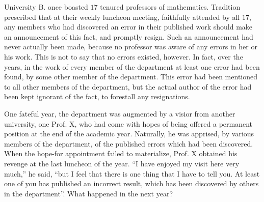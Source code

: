 \begin{pr}[*] \label{2.27} %
  University B. once boasted $17$ tenured professors of
  mathematics. Tradition prescribed that at their weekly
  luncheon meeting, faithfully attended by all $17$, any members
  who had discovered an error in their published work should
  make an announcement of this fact, and promptly resign.
  Such an announcement had never actually been made, because
  no professor was aware of any errors in her or his work.
  This is not to say that no errors existed, however. In fact,
  over the years, in the work of every member of the department
  at least one error had been found, by some other member of the
  department. This error had been mentioned to all other members
  of the department, but the actual author of the error
  had been kept ignorant of the fact, to forestall any
  resignations.
  \par
  One fateful year, the department was augmented by a visior
  from another university, one Prof. X, who had come with
  hopes of being offered a permanent position at the end of
  the academic year. Naturally, he was apprised, by various members
  of the department, of the published errors which had been
  discovered. When the hope-for appointment failed to materialize,
  Prof. X obtained his revenge at the last luncheon of the year.
  ``I have enjoyed my visit here very much,'' he said, ``but
  I feel that there is one thing that I have to tell you.
  At least one of you has published an incorrect result,
  which has been discovered by others in the department''.
  What happened in the next year?
\end{pr}

\begin{solution} %
  
\end{solution}

